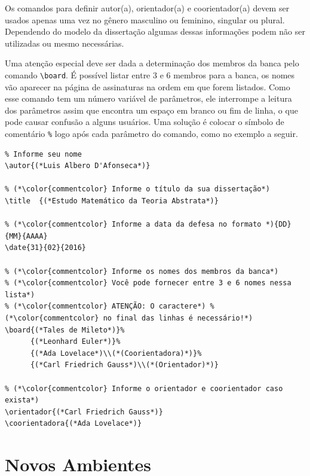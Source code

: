 \documentclass[fleqn]{icat-ufal}
\begin{document}
Os comandos para definir autor(a), orientador(a) e coorientador(a) devem ser
usados apenas uma vez no gênero masculino ou feminino, singular ou plural.
Dependendo do modelo da dissertação algumas dessas informações podem não ser
utilizadas ou mesmo necessárias.

Uma atenção especial deve ser dada a determinação dos membros da banca pelo
comando \lstinline!\board!. É possível listar entre 3 e 6 membros para a banca,
os nomes vão aparecer na página de assinaturas na ordem em que forem listados.
Como esse comando tem um número variável de parâmetros, ele interrompe a leitura
dos parâmetros assim que encontra um espaço em branco ou fim de linha, o que
pode causar confusão a alguns usuários. Uma solução é colocar o símbolo de
comentário \lstinline{%}
logo após cada parâmetro do comando, como no exemplo a seguir.
    
\begin{lstlisting}
% Informe seu nome
\autor{(*Luis Albero D'Afonseca*)}

% (*\color{commentcolor} Informe o título da sua dissertação*)
\title  {(*Estudo Matemático da Teoria Abstrata*)}

% (*\color{commentcolor} Informe a data da defesa no formato *){DD}{MM}{AAAA}
\date{31}{02}{2016}

% (*\color{commentcolor} Informe os nomes dos membros da banca*)
% (*\color{commentcolor} Você pode fornecer entre 3 e 6 nomes nessa lista*)
% (*\color{commentcolor} ATENÇÃO: O caractere*) % (*\color{commentcolor} no final das linhas é necessário!*)
\board{(*Tales de Mileto*)}%
      {(*Leonhard Euler*)}%
      {(*Ada Lovelace*)\\(*(Coorientadora)*)}%
      {(*Carl Friedrich Gauss*)\\(*(Orientador)*)}

% (*\color{commentcolor} Informe o orientador e coorientador caso exista*)
\orientador{(*Carl Friedrich Gauss*)}
\coorientadora{(*Ada Lovelace*)}
\end{lstlisting}

\section{Novos Ambientes}
\label{sec:novos_ambientes}
\end{document}
